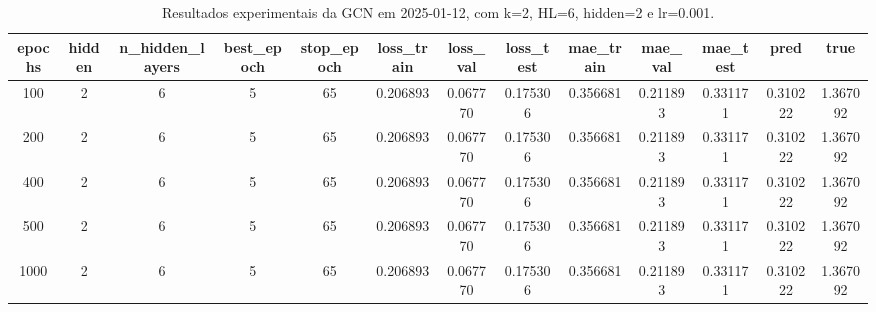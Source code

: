 \begin{table}[h]
\centering
\caption{Resultados experimentais da GCN em 2025-01-12, com k=2, HL=6, hidden=2 e lr=0.001.}
\label{tab:gcn_results_k2_hl6_h2_d20250112}
\begin{tabular}{ccccccccccccc}
\toprule
epochs & hidden & n\_hidden\_layers & best\_epoch & stop\_epoch & loss\_train & loss\_val & loss\_test & mae\_train & mae\_val & mae\_test & pred & true \\
\midrule
100 & 2 & 6 & 5 & 65 & 0.206893 & 0.067770 & 0.175306 & 0.356681 & 0.211893 & 0.331171 & 0.310222 & 1.367092 \\
200 & 2 & 6 & 5 & 65 & 0.206893 & 0.067770 & 0.175306 & 0.356681 & 0.211893 & 0.331171 & 0.310222 & 1.367092 \\
400 & 2 & 6 & 5 & 65 & 0.206893 & 0.067770 & 0.175306 & 0.356681 & 0.211893 & 0.331171 & 0.310222 & 1.367092 \\
500 & 2 & 6 & 5 & 65 & 0.206893 & 0.067770 & 0.175306 & 0.356681 & 0.211893 & 0.331171 & 0.310222 & 1.367092 \\
1000 & 2 & 6 & 5 & 65 & 0.206893 & 0.067770 & 0.175306 & 0.356681 & 0.211893 & 0.331171 & 0.310222 & 1.367092 \\
\bottomrule
\end{tabular}
\end{table}
